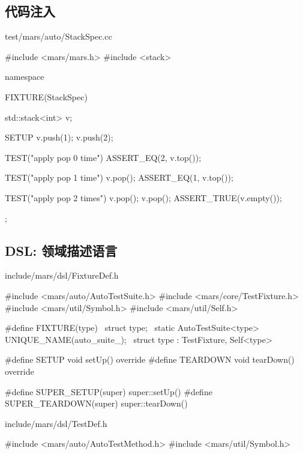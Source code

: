 \begin{content}

\subsection{代码注入}

\begin{nodiff}{test/mars/auto/StackSpec.cc}
 \begin{c++}
#include <mars/mars.h>
#include <stack>

namespace {
  FIXTURE(StackSpec) {
    std::stack<int> v;

    SETUP {
      v.push(1);
      v.push(2);
    }

    TEST("apply pop 0 time") {
      ASSERT_EQ(2, v.top());
    }

    TEST("apply pop 1 time") {
      v.pop();
      ASSERT_EQ(1, v.top());
    }

    TEST("apply pop 2 times") {
      v.pop();
      v.pop();
      ASSERT_TRUE(v.empty());
    }
  };
}
 \end{c++}
\end{nodiff}

\subsection{DSL: 领域描述语言}

\begin{nodiff}{include/mars/dsl/FixtureDef.h}
 \begin{c++}
#include <mars/auto/AutoTestSuite.h>
#include <mars/core/TestFixture.h>
#include <mars/util/Symbol.h>
#include <mars/util/Self.h>

#define FIXTURE(type)                                \
struct type;                                         \
static AutoTestSuite<type> UNIQUE_NAME(auto_suite_); \
struct type : TestFixture, Self<type>

#define SETUP    void setUp() override
#define TEARDOWN void tearDown() override

#define SUPER_SETUP(super)    super::setUp()
#define SUPER_TEARDOWN(super) super::tearDown()
 \end{c++}
\end{nodiff}

\begin{nodiff}{include/mars/dsl/TestDef.h}
 \begin{c++}
#include <mars/auto/AutoTestMethod.h>
#include <mars/util/Symbol.h>


\end{c++}
\end{nodiff}
\end{content}
